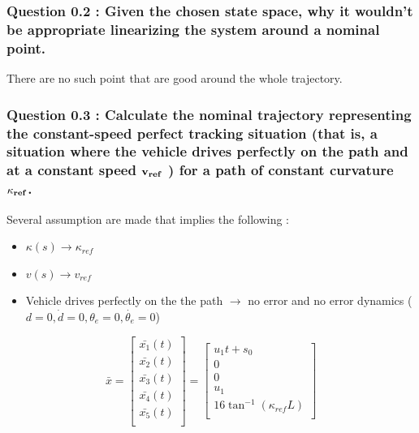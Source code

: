 \subsubsection*{Question 0.2 : Given the chosen state space, why it wouldn’t be appropriate linearizing the system around a nominal point.}
There are no such point that are good around the whole trajectory.



\subsubsection*{Question 0.3 : Calculate the nominal trajectory representing the constant-speed perfect tracking situation (that is, a situation where the vehicle drives perfectly on the path and at a constant speed $\bold{v_{ref}}$ ) for a path of constant curvature $\bold{\kappa_{ref}}$.}
Several assumption are made that implies the following :
\begin{itemize}
    \item $\kappa(s) \longrightarrow \kappa_{ref}$
    \item $v(s) \longrightarrow v_{ref}$
    \item Vehicle drives perfectly on the the path $\longrightarrow$ no error and no error dynamics ($d=0, \dot{d}=0, \theta_e=0, \dot{\theta_e}=0$)
\end{itemize}

\begin{equation}
    \bar{x}
    =
    \left[ {\begin{array}{c}
        \bar{x_1}(t)\\
        \bar{x_2}(t)\\
        \bar{x_3}(t)\\
        \bar{x_4}(t)\\
        \bar{x_5}(t)\\
    \end{array} } \right]
    =
    \left[ {\begin{array}{c}
        u_1 t + s_0\\
        0\\
        0\\
        u_1\\
        16 \tan^{-1}(\kappa_{ref} L)\\
    \end{array} } \right]
    \label{eq:trajectory}
\end{equation}



